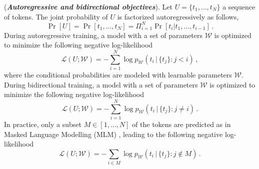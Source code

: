 \begin{definition}
\label{def-objective-functions}
%
(\textbf{\emph{Autoregressive and bidirectional objectives}}).
%
Let $U = \{t_1, \dots, t_N\}$ a sequence of tokens.
%
The joint probability of $U$ is factorized autoregressively as follows,
%
\begin{equation}
    \Pr[U] = \Pr[t_1,\dots,t_N] = \Pi_{i=1}^N \Pr[t_i|t_1,\dots,t_{i-1}]\,.
\end{equation}
%
During autoregressive training, a model with a set of parameters $\mathcal{W}$ is optimized to minimize the following negative log-likelihood
%
\begin{equation}
\mathcal{L}(U; \mathcal{W}) = - \sum_{i=1}^{N} \log p_{\mathcal{W}}(t_i \,|\, \{t_j\} : j < i)\,,
\end{equation}
%
where the conditional probabilities are modeled with learnable parameters $\mathcal{W}$.
%
%
During bidirectional training, a model with a set of parameters $\mathcal{W}$ is optimized to minimize the following negative log-likelihood
%
\begin{equation}
\mathcal{L}(U; \mathcal{W}) = - \sum_{i=1}^{N} \log p_{\mathcal{W}}(t_i \,|\, \{t_j\} : j \neq i)\,.
\end{equation}
%
In practice, only a subset $M\in [1,\dots,N]$ of the tokens are predicted as in  Masked Language Modelling (MLM) \citep[see ][]{devlinBERTPretrainingDeep2019,warnerSmarterBetterFaster2024}, leading to the following negative log-likelihood
%
\begin{equation}
\mathcal{L}(U; \mathcal{W}) = - \sum_{i\in M} \log p_{\mathcal{W}}(t_i \,|\, \{t_j\} : j \notin M)\,.
\end{equation}
%
\end{definition}